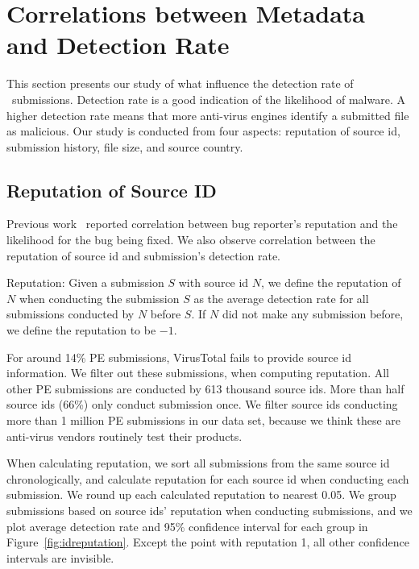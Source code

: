 \section{Correlations between Metadata and Detection Rate}
\label{sec:corr}
This section presents our study of what influence the detection rate of \pe\ submissions.
Detection rate is a good indication of the likelihood of malware.
A higher detection rate means that more anti-virus engines identify a submitted file as malicious.
Our study is conducted from four aspects: reputation of source id, submission history, 
file size, and source country.



\subsection{Reputation of Source ID}
\label{sec:reputation}

Previous work~\cite{GuoICSE2010} reported correlation between bug reporter’s reputation and the likelihood for the bug being fixed. 
We also observe correlation between the reputation of source id and submission’s detection rate. 

\begin{definition}{Reputation:}
Given a submission $S$ with source id $N$, 
we define the reputation of $N$ when conducting the submission $S$ as the average detection rate for all submissions conducted by $N$ before $S$. 
If $N$ did not make any submission before, we define the reputation to be $-1$. 
\end{definition}

For around 14\% PE submissions, VirusTotal fails to provide source id information. 
We filter out these submissions, when computing reputation.
All other PE submissions are conducted by 613 thousand source ids. 
More than half source ids (66\%) only conduct submission once. 
We filter source ids conducting more than 1 million PE submissions in our data set, 
because we think these are anti-virus vendors routinely test their products. 

When calculating reputation, we sort all submissions from the same source id chronologically, 
and calculate reputation for each source id when conducting each submission. 
We round up each calculated reputation to nearest 0.05. 
We group submissions based on source ids' reputation when conducting submissions, 
and we plot average detection rate and 95\% confidence interval for each group in Figure~\ref{fig:idreputation}. 
Except the point with reputation 1, all other confidence intervals are invisible.  

